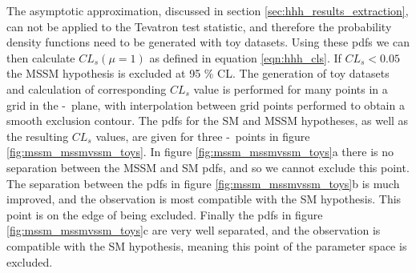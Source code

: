 The asymptotic approximation, discussed in section \ref{sec:hhh_results_extraction}, can not be applied
to the Tevatron test statistic, and therefore the probability density functions need to be generated 
with toy datasets. Using these pdfs we can then calculate $CL_s(\mu=1)$ as defined in equation \ref{eqn:hhh_cls}.
If $CL_s < 0.05$ the MSSM hypothesis is excluded at 95 \% CL. The generation of toy datasets and 
calculation of corresponding $CL_s$ value is performed for many points in a grid in the \mA-\tanb~plane,
with interpolation between grid points performed to obtain a smooth exclusion contour.
The pdfs for the SM and MSSM hypotheses, as well as the resulting $CL_s$ values,
are given for three \mA-\tanb~points in figure \ref{fig:mssm_mssmvssm_toys}. In figure \ref{fig:mssm_mssmvssm_toys}a
there is no separation between the MSSM and SM pdfs, and so we cannot exclude this point. The separation
between the pdfs in figure \ref{fig:mssm_mssmvssm_toys}b is much improved, and the observation is most compatible
with the SM hypothesis. This point is on the edge of being excluded. Finally the pdfs in figure \ref{fig:mssm_mssmvssm_toys}c
are very well separated, and the observation is compatible with the SM hypothesis, meaning this point of the parameter space is excluded.

